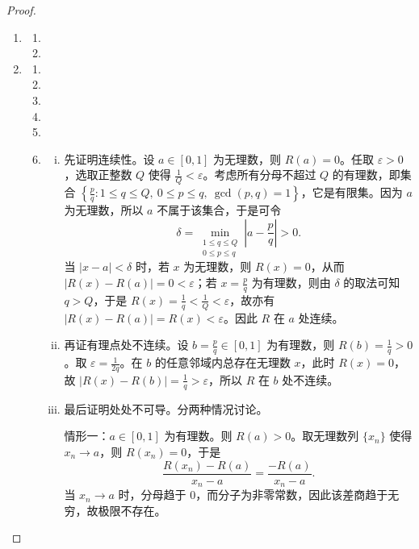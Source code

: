 \documentclass[../../main.tex]{subfiles}%
\begin{document}
\begin{proof}
\begin{enumerate}
\item \begin{enumerate}[(1)]
\item 

\item 
\end{enumerate}

\item \begin{enumerate}[(1)]
\item 

\item 

\item 

\item 

\item 

\item \begin{enumerate}[(i)]
\item 先证明连续性。设 $a\in[0,1]$ 为无理数，则 $R(a)=0$。任取 $\varepsilon>0$，选取正整数 $Q$ 使得 $\frac{1}{Q}<\varepsilon$。考虑所有分母不超过 $Q$ 的有理数，即集合
$\left\{\frac{p}{q}: 1\leqslant q\leqslant Q,\ 0\leqslant p\leqslant q,\ \gcd(p,q)=1\right\}$，它是有限集。因为 $a$ 为无理数，所以 $a$ 不属于该集合，于是可令
\[
\delta=\min_{\substack{1\leqslant q\leqslant Q\\0\leqslant p\leqslant q}} \left|a-\frac{p}{q}\right|>0.
\]
当 $|x-a|<\delta$ 时，若 $x$ 为无理数，则 $R(x)=0$，从而 $|R(x)-R(a)|=0<\varepsilon$；若 $x=\frac{p}{q}$ 为有理数，则由 $\delta$ 的取法可知 $q>Q$，于是
$R(x)=\frac{1}{q}<\frac{1}{Q}<\varepsilon$，故亦有 $|R(x)-R(a)|=R(x)<\varepsilon$。因此 $R$ 在 $a$ 处连续。

\item 再证有理点处不连续。设 $b=\frac{p}{q}\in[0,1]$ 为有理数，则 $R(b)=\frac{1}{q}>0$。取 $\varepsilon=\frac{1}{2q}$。在 $b$ 的任意邻域内总存在无理数 $x$，此时 $R(x)=0$，故
$|R(x)-R(b)|=\frac{1}{q}>\varepsilon$，所以 $R$ 在 $b$ 处不连续。

\item 最后证明处处不可导。分两种情况讨论。

情形一：$a\in[0,1]$ 为有理数。则 $R(a)>0$。取无理数列 $\{x_n\}$ 使得 $x_n\to a$，则 $R(x_n)=0$，于是
\[
\frac{R(x_n)-R(a)}{x_n-a}=\frac{-R(a)}{x_n-a}.
\]
当 $x_n\to a$ 时，分母趋于 $0$，而分子为非零常数，因此该差商趋于无穷，故极限不存在。


\end{enumerate}
\end{enumerate}
\end{enumerate}
\end{proof}
\end{document}
